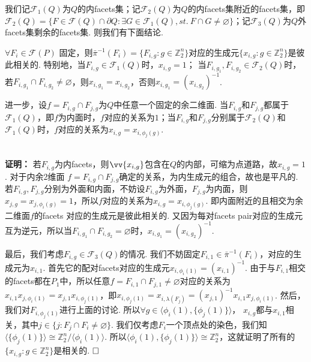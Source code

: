 \documentclass{article}
\theoremstyle{plain}%
\theoremstyle{definition}
\theoremstyle{remark}
\begin{document}
我们记$\mathcal{F}_1(Q)$为$Q$的内facets集；记$\mathcal{F}_2(Q)$为$Q$的内facets集附近的facets集，即$\mathcal{F}_2(Q)=\{F\in \mathcal{F}(Q)\cap \partial{Q}:\exists G \in\mathcal{F}_1(Q), st.~ F\cap G\neq \varnothing \}$；记$\mathcal{F}_3(Q)$为$Q$外facets集剩余的facets集. 则我们有下面结论.
{\lem \label{lem3}
$\forall F_i\in \mathcal{F}(P)$ 固定，则$\bar{\pi}^{-1}(F_i)=\{F_{i,g}:g\in\mathbb{Z}_2^n\}$对应的生成元$\{x_{i,g}:g\in\mathbb{Z}_2^n\}$是彼此相关的. 特别地，当$F_{i,g}\in \mathcal{F}_1(Q)$时，$x_{i,g}=1$； 当$F_{i,g_1}, F_{i,g_2}\in \mathcal{F}_2(Q)$时，若$F_{i,g_1}\cap F_{i,g_2}\neq \varnothing$，则$x_{i,g_1}= x_{i,g_2}$，否则$x_{i,g_1}= (x_{i,g_2})^{-1}$.

进一步，设$f=F_{i,g}\cap F_{j,g}$为$Q$中任意一个固定的余二维面. 当$F_{i,g}$和$F_{j,g}$都属于$\mathcal{F}_1(Q)$，即$f$为内面时，$f$对应的关系为$1$；当$F_{i,g}$和$F_{j,g}$分别属于$\mathcal{F}_2(Q)$和$\mathcal{F}_1(Q)$时，$f$对应的关系为$x_{i,g}=x_{i,\phi_j(g)}$.
}\\
{\bf 证明：}
若$F_{i,g}$为内facets，则$\vv{x_{i,g}}$包含在$Q$的内部，可缩为点道路，故$x_{i,g}=1$. 
对于内余2维面 $f=F_{i,g}\cap F_{j,g}$确定的关系，为内生成元的组合，故也是平凡的. 
若$F_{i,g},F_{j,g}$分别为外面和内面，不妨设$F_{i,g}$为外面，$F_{j,g}$为内面，则$x_{j,g}=x_{j,\phi_i(g)}=1$，所以$f$对应的关系为$x_{i,g}=x_{i,\phi_j(g)}$. 即内面附近的且相交为余二维面$f$的facets 对应的生成元是彼此相关的.
又因为每对facets pair对应的生成元互为逆元，所以当$F_{i,g_1}\cap F_{i,g_2}= \varnothing$时，$x_{i,g_1}= (x_{i,g_2})^{-1}$. 

最后，我们考虑$F_{i,g}\in \mathcal{F}_3(Q)$的情况. 我们不妨固定$F_{i,1}\in \bar{\pi}^{-1}(F_i)$，对应的生成元为$x_{i,1}$. 首先它的配对facets对应的生成元$x_{i,\phi_i(1)}=(x_{i,1})^{-1}$. 
由于与$F_{i,1}$相交的facets都在$P_{1}$中，所以任意$f=F_{i,1}\cap F_{j,1}\neq \varnothing$对应的关系为$x_{i,1}x_{j,\phi_i(1)}=x_{j,1}x_{i,\phi_j(1)}$，即$x_{i,\phi_j(1)}=x_{i,\lambda(F_j)}=(x_{j,1})^{-1}x_{i,1}x_{j,\phi_i(1)}$.
然后，我们对$F_{i,\phi_j(1)}$进行上面的讨论. 所以$\forall g \in \langle \phi_i(1),\{\phi_j(1)\}\rangle $， $x_{i,g}$都与$x_{i,1}$相关，其中$j\in \{j:F_j\cap F_i \neq \varnothing\}$. 我们仅考虑$F_i$一个顶点处的染色，我们知$\langle \{\phi_j(1)\}\rangle\cong \mathbb{Z}_2^{n}/\langle\phi_i(1)\rangle$. 所以$\langle \phi_i(1),\{\phi_j(1)\}\rangle \cong \mathbb{Z}_2^{n}$，这就证明了所有的$\{x_{i,g}:g\in \mathbb{Z}_2^{n}\}$是相关的.
$\hfill{} \Box$
\end{document}
